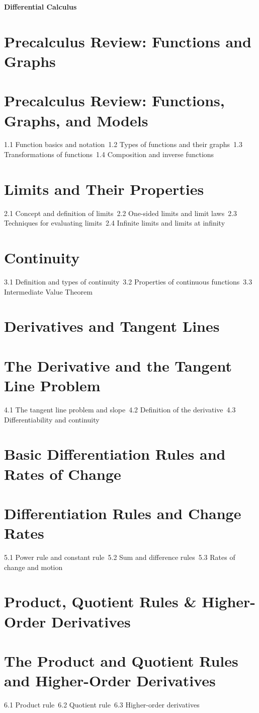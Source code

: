 {\LARGE \bf{Differential Calculus}}
\section{Precalculus Review: Functions and Graphs}
\section{Precalculus Review: Functions, Graphs, and Models}
1.1 Function basics and notation\
1.2 Types of functions and their graphs\
1.3 Transformations of functions\
1.4 Composition and inverse functions\
\section{Limits and Their Properties}
2.1 Concept and definition of limits\
2.2 One-sided limits and limit laws\
2.3 Techniques for evaluating limits\
2.4 Infinite limits and limits at infinity\
\section{Continuity}
3.1 Definition and types of continuity\
3.2 Properties of continuous functions\
3.3 Intermediate Value Theorem\
\section{Derivatives and Tangent Lines}
\section{The Derivative and the Tangent Line Problem}
4.1 The tangent line problem and slope\
4.2 Definition of the derivative\
4.3 Differentiability and continuity\
\section{Basic Differentiation Rules and Rates of Change}
\section{Differentiation Rules and Change Rates}
5.1 Power rule and constant rule\
5.2 Sum and difference rules\
5.3 Rates of change and motion\
\section{Product, Quotient Rules \& Higher-Order Derivatives}
\section{The Product and Quotient Rules and Higher-Order Derivatives}
6.1 Product rule\
6.2 Quotient rule\
6.3 Higher-order derivatives\
